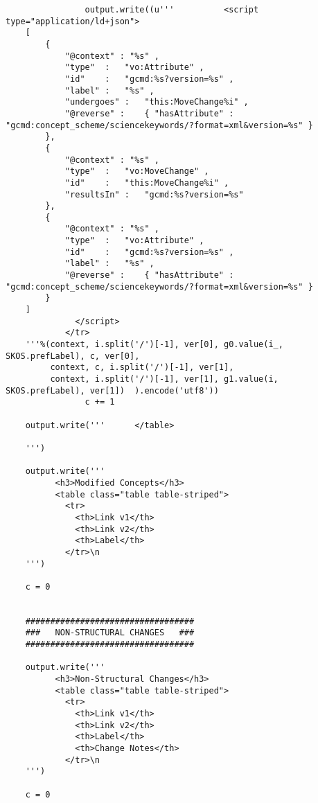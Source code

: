 \begin{verbatim}
				output.write((u'''          <script  type="application/ld+json">
	[
		{
			"@context" : "%s" ,
			"type"	:	"vo:Attribute" ,
			"id"	:	"gcmd:%s?version=%s" ,
			"label"	:	"%s" ,
			"undergoes" :	"this:MoveChange%i" ,
			"@reverse" :	{ "hasAttribute" : "gcmd:concept_scheme/sciencekeywords/?format=xml&version=%s" }
		},
		{
			"@context" : "%s" ,
			"type"	:	"vo:MoveChange" ,
			"id"	:	"this:MoveChange%i" ,
			"resultsIn"	:	"gcmd:%s?version=%s"
		},
		{
			"@context" : "%s" ,
			"type"	:	"vo:Attribute" ,
			"id"	:	"gcmd:%s?version=%s" ,
			"label"	:	"%s" ,
			"@reverse" :	{ "hasAttribute" : "gcmd:concept_scheme/sciencekeywords/?format=xml&version=%s" }
		}
	]
	          </script>
	        </tr>
	'''%(context, i.split('/')[-1], ver[0], g0.value(i_, SKOS.prefLabel), c, ver[0], 
	     context, c, i.split('/')[-1], ver[1], 
	     context, i.split('/')[-1], ver[1], g1.value(i, SKOS.prefLabel), ver[1])  ).encode('utf8'))
				c += 1
	
	output.write('''      </table>
	
	''')
	
	output.write('''
	      <h3>Modified Concepts</h3>
	      <table class="table table-striped">
	        <tr>
	          <th>Link v1</th>
	          <th>Link v2</th>
	          <th>Label</th>
	        </tr>\n
	''')
	
	c = 0
				
	
	##################################
	###   NON-STRUCTURAL CHANGES   ###
	##################################
	
	output.write('''
	      <h3>Non-Structural Changes</h3>
	      <table class="table table-striped">
	        <tr>
	          <th>Link v1</th>
	          <th>Link v2</th>
	          <th>Label</th>
	          <th>Change Notes</th>
	        </tr>\n
	''')
	
	c = 0
	

\end{verbatim}
